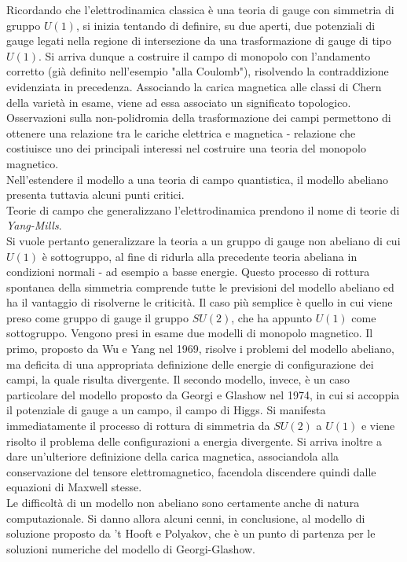 Ricordando che l'elettrodinamica classica è una teoria di gauge con simmetria
di gruppo $U(1)$, si inizia tentando di definire, su due aperti, due potenziali di
gauge legati nella regione di intersezione da una trasformazione di
gauge di tipo $U(1)$. Si arriva dunque a costruire il campo di monopolo
con l'andamento corretto (già definito nell'esempio "alla Coulomb"), risolvendo
la contraddizione evidenziata in precedenza.
Associando la carica magnetica alle classi di Chern della varietà in esame, viene
ad essa associato un significato topologico. \\
Osservazioni sulla non-polidromia della trasformazione dei campi permettono di
ottenere una relazione tra le cariche elettrica e magnetica - relazione che costiuisce
uno dei principali interessi nel costruire una teoria del monopolo magnetico.\\
Nell'estendere il modello a una teoria di campo quantistica,
il modello abeliano presenta tuttavia alcuni punti critici.\\

Teorie di campo che generalizzano l'elettrodinamica prendono il nome di
teorie di \emph{Yang-Mills}.\\
Si vuole pertanto generalizzare la teoria a un gruppo di gauge non abeliano di cui
$U(1)$ è sottogruppo, al fine di ridurla alla precedente teoria abeliana in
condizioni normali - ad esempio a basse energie.
Questo processo di rottura spontanea della simmetria comprende tutte le previsioni
del modello abeliano ed ha il vantaggio di risolverne le criticità.
Il caso più semplice è quello in cui viene preso come gruppo di gauge il gruppo
$SU(2)$, che ha appunto $U(1)$ come sottogruppo.
Vengono presi in esame due modelli di monopolo magnetico.
Il primo, proposto da Wu e Yang nel 1969, risolve i problemi del modello abeliano,
ma deficita di una appropriata definizione delle energie di configurazione dei campi,
la quale risulta divergente.
Il secondo modello, invece, è un caso
particolare del modello proposto da Georgi e Glashow nel 1974, in cui
si accoppia il potenziale di gauge a un campo, il campo di Higgs. Si manifesta
immediatamente il processo di rottura di simmetria da $SU(2)$ a $U(1)$ e viene
risolto il problema delle configurazioni a energia divergente. Si arriva inoltre
a dare un'ulteriore definizione della carica magnetica, associandola alla
conservazione del tensore elettromagnetico, facendola discendere quindi dalle equazioni di
Maxwell stesse.\\

Le difficoltà di un modello non abeliano sono certamente anche di natura
computazionale. Si danno allora alcuni cenni, in conclusione, al modello di
soluzione proposto da 't Hooft e Polyakov, che è un punto di partenza per le
soluzioni numeriche del modello di Georgi-Glashow.


